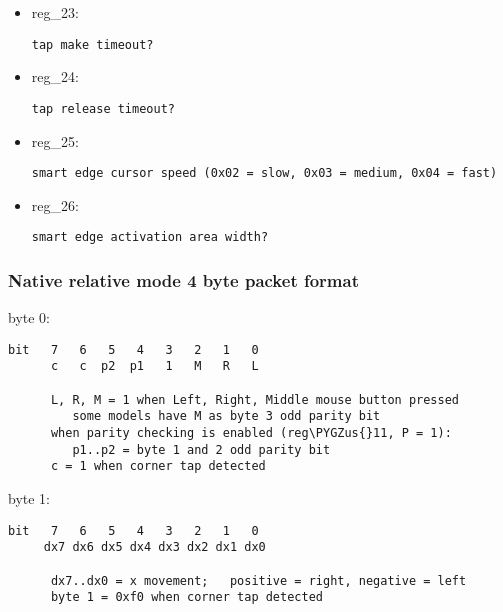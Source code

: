 \documentclass[a4paper,8pt,english]{sphinxmanual}
\def\PYGZus{\char`\_}
\begin{document}
\begin{itemize}
\item {} 
reg\_23:

\begin{Verbatim}[commandchars=\\\{\}]
tap make timeout?
\end{Verbatim}

\item {} 
reg\_24:

\begin{Verbatim}[commandchars=\\\{\}]
tap release timeout?
\end{Verbatim}

\item {} 
reg\_25:

\begin{Verbatim}[commandchars=\\\{\}]
smart edge cursor speed (0x02 = slow, 0x03 = medium, 0x04 = fast)
\end{Verbatim}

\item {} 
reg\_26:

\begin{Verbatim}[commandchars=\\\{\}]
smart edge activation area width?
\end{Verbatim}

\end{itemize}


\subsubsection{Native relative mode 4 byte packet format}
\label{input/devices/elantech:native-relative-mode-4-byte-packet-format}
byte 0:

\begin{Verbatim}[commandchars=\\\{\}]
bit   7   6   5   4   3   2   1   0
      c   c  p2  p1   1   M   R   L

      L, R, M = 1 when Left, Right, Middle mouse button pressed
         some models have M as byte 3 odd parity bit
      when parity checking is enabled (reg\PYGZus{}11, P = 1):
         p1..p2 = byte 1 and 2 odd parity bit
      c = 1 when corner tap detected
\end{Verbatim}

byte 1:

\begin{Verbatim}[commandchars=\\\{\}]
bit   7   6   5   4   3   2   1   0
     dx7 dx6 dx5 dx4 dx3 dx2 dx1 dx0

      dx7..dx0 = x movement;   positive = right, negative = left
      byte 1 = 0xf0 when corner tap detected
\end{Verbatim}
\end{document}
